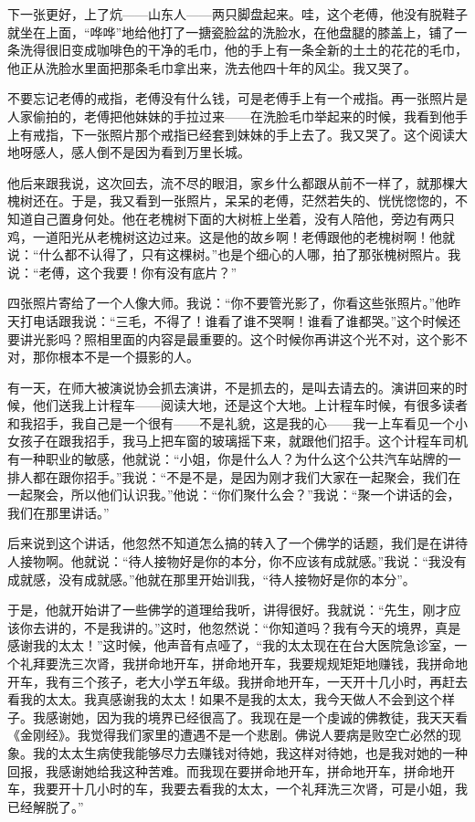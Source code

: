 \par 下一张更好，上了炕——山东人——两只脚盘起来。哇，这个老傅，他没有脱鞋子就坐在上面，“哗哗”地给他打了一搪瓷脸盆的洗脸水，在他盘腿的膝盖上，铺了一条洗得很旧变成咖啡色的干净的毛巾，他的手上有一条全新的土土的花花的毛巾，他正从洗脸水里面把那条毛巾拿出来，洗去他四十年的风尘。我又哭了。
\par 不要忘记老傅的戒指，老傅没有什么钱，可是老傅手上有一个戒指。再一张照片是人家偷拍的，老傅把他妹妹的手拉过来——在洗脸毛巾举起来的时候，我看到他手上有戒指，下一张照片那个戒指已经套到妹妹的手上去了。我又哭了。这个阅读大地呀感人，感人倒不是因为看到万里长城。
\par 他后来跟我说，这次回去，流不尽的眼泪，家乡什么都跟从前不一样了，就那棵大槐树还在。于是，我又看到一张照片，呆呆的老傅，茫然若失的、恍恍惚惚的，不知道自己置身何处。他在老槐树下面的大树桩上坐着，没有人陪他，旁边有两只鸡，一道阳光从老槐树这边过来。这是他的故乡啊！老傅跟他的老槐树啊！他就说：“什么都不认得了，只有这棵树。”也是个细心的人哪，拍了那张槐树照片。我说：“老傅，这个我要！你有没有底片？”
\par 四张照片寄给了一个人像大师。我说：“你不要管光影了，你看这些张照片。”他昨天打电话跟我说：“三毛，不得了！谁看了谁不哭啊！谁看了谁都哭。”这个时候还要讲光影吗？照相里面的内容是最重要的。这个时候你再讲这个光不对，这个影不对，那你根本不是一个摄影的人。
\par 有一天，在师大被演说协会抓去演讲，不是抓去的，是叫去请去的。演讲回来的时候，他们送我上计程车——阅读大地，还是这个大地。上计程车时候，有很多读者和我招手，我自己是一个很有——不是礼貌，这是我的心——我一上车看见一个小女孩子在跟我招手，我马上把车窗的玻璃摇下来，就跟他们招手。这个计程车司机有一种职业的敏感，他就说：“小姐，你是什么人？为什么这个公共汽车站牌的一排人都在跟你招手。”我说：“不是不是，是因为刚才我们大家在一起聚会，我们在一起聚会，所以他们认识我。”他说：“你们聚什么会？”我说：“聚一个讲话的会，我们在那里讲话。”
\par 后来说到这个讲话，他忽然不知道怎么搞的转入了一个佛学的话题，我们是在讲待人接物啊。他就说：“待人接物好是你的本分，你不应该有成就感。”我说：“我没有成就感，没有成就感。”他就在那里开始训我，“待人接物好是你的本分”。
\par 于是，他就开始讲了一些佛学的道理给我听，讲得很好。我就说：“先生，刚才应该你去讲的，不是我讲的。”这时，他忽然说：“你知道吗？我有今天的境界，真是感谢我的太太！”这时候，他声音有点哑了，“我的太太现在在台大医院急诊室，一个礼拜要洗三次肾，我拼命地开车，拼命地开车，我要规规矩矩地赚钱，我拼命地开车，我有三个孩子，老大小学五年级。我拼命地开车，一天开十几小时，再赶去看我的太太。我真感谢我的太太！如果不是我的太太，我今天做人不会到这个样子。我感谢她，因为我的境界已经很高了。我现在是一个虔诚的佛教徒，我天天看《金刚经》。我觉得我们家里的遭遇不是一个悲剧。佛说人要病是败空亡必然的现象。我的太太生病使我能够尽力去赚钱对待她，我这样对待她，也是我对她的一种回报，我感谢她给我这种苦难。而我现在要拼命地开车，拼命地开车，拼命地开车，我要开十几小时的车，我要去看我的太太，一个礼拜洗三次肾，可是小姐，我已经解脱了。”
